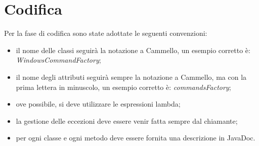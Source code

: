 
\section{Codifica}\label{sec:codifica}
Per la fase di codifica sono state adottate le seguenti convenzioni:
\begin{itemize}
    \item il nome delle classi seguirà la notazione a Cammello, un esempio corretto è: \textit{WindowsCommandFactory};
    \item il nome degli attributi seguirà sempre la notazione a Cammello, ma con la prima lettera in minuscolo, un esempio corretto è: \textit{commandsFactory};
    \item ove possibile, si deve utilizzare le espressioni lambda;
    \item la gestione delle eccezioni deve essere venir fatta sempre dal chiamante;
    \item per ogni classe e ogni metodo deve essere fornita una descrizione in JavaDoc.
\end{itemize}


